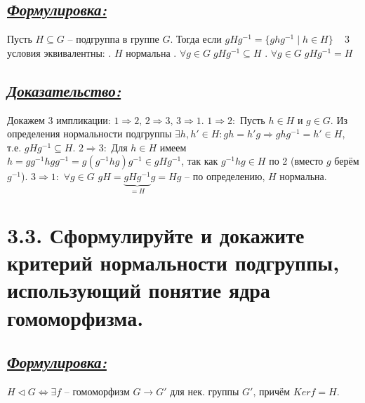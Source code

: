 \documentclass{article}
\begin{document}
\subsection*{\Large \underline{\textit{Формулировка: }}}
Пусть $H \subseteq G$ -- подгруппа в группе $G$. Тогда если $gHg^{-1} = \{ghg^{-1}\;|\;h\in H\}\;\;\;$ 3 условия эквивалентны:
\newline {}. $H$ нормальна
\newline {}. $\forall g \in G \; gHg^{-1} \subseteq H $
\newline {}. $\forall g \in G \; gHg^{-1} = H $

\subsection*{\Large \underline{\textit{Доказательство: }}}
Докажем 3 импликации: $1 \Rightarrow 2, \, 2 \Rightarrow 3, \, 3 \Rightarrow 1$.
\newline \indent \underline{$1 \Rightarrow 2:$}
\newline Пусть $h \in H$ и $g \in G$. Из определения нормальности подгруппы 
\newline $\exists h, h' \in H : gh = h'g \Rightarrow ghg^{-1} = h' \in H$, т.е. $gHg^{-1} \subseteq H$. 
\newline \indent \underline{$2 \Rightarrow 3:$}
\newline Для $h \in H$ имеем $h = gg^{-1}hgg^{-1} = g(g^{-1}hg)g^{-1} \in gHg^{-1}$, так как $g^{-1}hg \in H$ по 2 (вместо $g$ берём $g^{-1}$).
\newline \indent \underline{$3 \Rightarrow 1:$}
\newline $\forall g \in G$  $gH = \underbrace{gHg^{-1}}_{= H}g = Hg$ -- по определению, $H$ нормальна.

\section*{\LARGE 3.3. Сформулируйте и докажите критерий нормальности подгруппы, использующий понятие ядра гомоморфизма. }
\subsection*{\Large \underline{\textit{Формулировка: }}}
$H\triangleleft G \Leftrightarrow \exists f \mbox{ -- гомоморфизм } G \rightarrow G' \mbox{ для нек. группы } G',\, \mbox{причём } Kerf = H$. 
\end{document}
